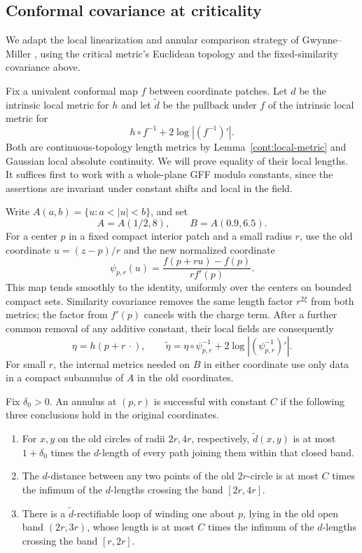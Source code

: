 \subsection{Conformal covariance at criticality}\label{cont:covariance-section}

We adapt the local linearization and annular comparison strategy of
Gwynne--Miller \cite[Sections~2--3]{GMCovariance}, using the critical
metric's Euclidean topology and the fixed-similarity covariance above.

Fix a univalent conformal map $f$ between coordinate patches.  Let $d$ be the
intrinsic local metric for $h$ and let $\widetilde d$ be the pullback under $f$
of the intrinsic local metric for
\[
 h\circ f^{-1}+2\log|(f^{-1})'|.
\]
Both are continuous-topology length metrics by Lemma~\ref{cont:local-metric}
and Gaussian local absolute continuity.  We will prove equality of their
local lengths.  It suffices first to work with a whole-plane GFF modulo
constants, since the assertions are invariant under constant shifts and
local in the field.

Write $A(a,b)=\{u:a<|u|<b\}$, and set
\[
 A=A(1/2,8),\qquad B=A(0.9,6.5).
\]
For a center $p$ in a fixed compact interior patch and a small radius $r$,
use the old coordinate $u=(z-p)/r$ and the new normalized coordinate
\[
 \psi_{p,r}(u)=\frac{f(p+ru)-f(p)}{rf'(p)}.
\]
This map tends smoothly to the identity, uniformly over the centers on
bounded compact sets.  Similarity covariance removes the same length factor
$r^{2\xi}$ from both metrics; the factor from $f'(p)$ cancels with the charge
term.  After a further common removal of any additive constant, their local
fields are consequently
\begin{equation}\label{cont:annular-fields}
 \eta=h(p+r\,\cdot),\qquad
 \widetilde\eta=\eta\circ\psi_{p,r}^{-1}
                         +2\log|(\psi_{p,r}^{-1})'|.
\end{equation}
For small $r$, the internal metrics needed on $B$ in either coordinate use
only data in a compact subannulus of $A$ in the old coordinates.

\begin{definition}\label{cont:successful-annulus}
Fix $\delta_0>0$.  An annulus at $(p,r)$ is successful with constant $C$ if
the following three conclusions hold in the original coordinates.
\begin{enumerate}[label=(\roman*)]
 \item For $x,y$ on the old circles of radii $2r,4r$, respectively,
 $\widetilde d(x,y)$ is at most $1+\delta_0$ times the $d$-length of every
 path joining them within that closed band.
 \item The $d$-distance between any two points of the old $2r$-circle is at
 most $C$ times the infimum of the $d$-lengths crossing the band $[2r,4r]$.
 \item There is a $\widetilde d$-rectifiable loop of winding one about $p$,
 lying in the old open band $(2r,3r)$, whose length is at most $C$ times the
 infimum of the $d$-lengths crossing the band $[r,2r]$.
\end{enumerate}
\end{definition}

